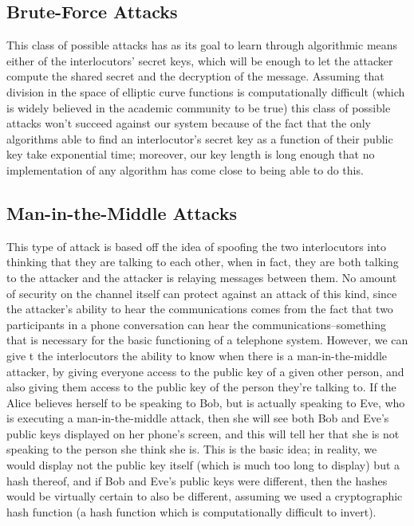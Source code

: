 \documentclass[a4paper]{article}
\begin{document}
\subsection{Brute-Force Attacks} 

This class of possible attacks has as its goal to learn through algorithmic means either of the interlocutors' secret keys, which will be enough to let the attacker compute the shared secret and the decryption of the message. Assuming that division in the space of elliptic curve functions is computationally difficult (which is widely believed in the academic community to be true) this class of possible attacks won't succeed against our system because of the fact that the only algorithms able to find an interlocutor's secret key as a function of their public key take exponential time; moreover, our key length is long enough that no implementation of any algorithm has come close to being able to do this.

\subsection{Man-in-the-Middle Attacks}

This type of attack is based off the idea of spoofing the two interlocutors into thinking that they are talking to each other, when in fact, they are both talking to the attacker and the attacker is relaying messages between them. No amount of security on the channel itself can protect against an attack of this kind, since the attacker's ability to hear the communications comes from the fact that two participants in a phone conversation can hear the communications--something that is necessary for the basic functioning of a telephone system. However, we can give t the interlocutors the ability to know when there is a man-in-the-middle attacker, by giving everyone access to the public key of a given other person, and also giving them access to the public key of the person they're talking to. If the Alice believes herself to be speaking to Bob, but is actually speaking to Eve, who is executing a man-in-the-middle attack, then she will see both Bob and Eve's public keys displayed on her phone's screen, and this will tell her that she is not speaking to the person she think she is. This is the basic idea; in reality, we would display not the public key itself (which is much too long to display) but a hash thereof, and if Bob and Eve's public keys were different, then the hashes would be virtually certain to also be different, assuming we used a cryptographic hash function (a hash function which is computationally difficult to invert).
\end{document}
